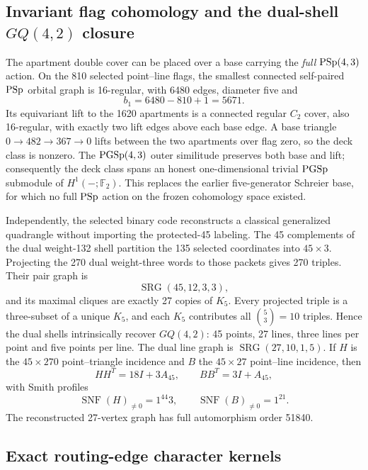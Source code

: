 \subsection{Invariant flag cohomology and the dual-shell $GQ(4,2)$ closure}

The apartment double cover can be placed over a base carrying the \emph{full}
$\mathrm{PSp}(4,3)$ action.  On the 810 selected point--line flags, the smallest
connected self-paired $\mathrm{PSp}$ orbital graph is 16-regular, with 6480 edges,
diameter five and
\[
 b_1=6480-810+1=5671.
\]
Its equivariant lift to the 1620 apartments is a connected regular $C_2$ cover,
also 16-regular, with exactly two lift edges above each base edge.  A base
triangle $0\to482\to367\to0$ lifts between the two apartments over flag zero,
so the deck class is nonzero.  The $\mathrm{PGSp}(4,3)$ outer similitude preserves both
base and lift; consequently the deck class spans an honest one-dimensional
trivial $\mathrm{PGSp}$ submodule of $H^1(-;\mathbb F_2)$.  This replaces the earlier
five-generator Schreier base, for which no full $\mathrm{PSp}$ action on the frozen
cohomology space existed.

Independently, the selected binary code reconstructs a classical generalized
quadrangle without importing the protected-45 labeling.  The 45 complements of
the dual weight-132 shell partition the 135 selected coordinates into
$45\times3$.  Projecting the 270 dual weight-three words to those packets gives
270 triples.  Their pair graph is
\[
 \operatorname{SRG}(45,12,3,3),
\]
and its maximal cliques are exactly 27 copies of $K_5$.  Every projected triple
is a three-subset of a unique $K_5$, and each $K_5$ contributes all
$\binom53=10$ triples.  Hence the dual shells intrinsically recover
$GQ(4,2)$: 45 points, 27 lines, three lines per point and five points per line.
The dual line graph is $\operatorname{SRG}(27,10,1,5)$.  If $H$ is the
$45\times270$ point--triangle incidence and $B$ the $45\times27$ point--line
incidence, then
\[
 HH^{T}=18I+3A_{45},\qquad BB^{T}=3I+A_{45},
\]
with Smith profiles
\[
 \operatorname{SNF}(H)_{\ne0}=1^{44}3,
 \qquad
 \operatorname{SNF}(B)_{\ne0}=1^{21}.
\]
The reconstructed 27-vertex graph has full automorphism order 51840.

\subsection{Exact routing-edge character kernels}

